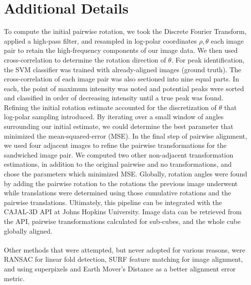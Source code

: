 \documentclass{article}
\begin{document}
\section{Additional Details}
To compute the initial pairwise rotation, we took the Discrete Fourier Transform, applied a high-pass filter, and resampled in log-polar coordinates $\rho,\theta$ each image pair to retain the high-frequency components of our image data. We then used cross-correlation to determine the rotation direction of $\theta$. For peak identification, the SVM classifier was trained with already-aligned images (ground truth). The cross-correlation of each image pair was also sectioned into nine equal parts. In each, the point of maximum intensity was noted and potential peaks were sorted and classified in order of decreasing intensity until a true peak was found. Refining the initial rotation estimate accounted for the discretization of $\theta$ that log-polar sampling introduced. By iterating over a small window of angles surrounding our initial estimate, we could determine the best parameter that minimized the mean-squared-error (MSE). In the final step of pairwise alignment, we used four adjacent images to refine the pairwise transformations for the sandwiched image pair. We computed two other non-adjacent transformation estimations, in addition to the original pairwise and no transformations, and chose the parameters which minimized MSE. Globally, rotation angles were found by adding the pairwise rotation to the rotations the previous image underwent while translations were determined using those cumulative rotations and the pairwise translations. Ultimately, this pipeline can be integrated with the CAJAL-3D API at Johns Hopkins University. Image data can be retrieved from the API, pairwise transformations calculated for sub-cubes, and the whole cube globally aligned.\\
\\
Other methods that were attempted, but never adopted for various reasons, were RANSAC for linear fold detection, SURF feature matching for image alignment, and using superpixels and Earth Mover's Distance as a better alignment error metric. 
\end{document}
